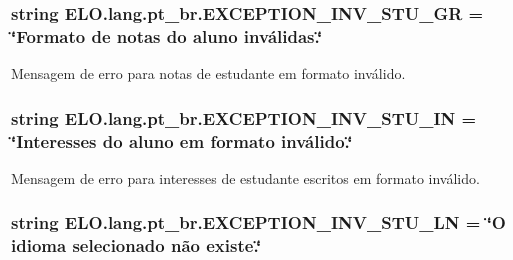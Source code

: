 \hypertarget{namespaceELO_1_1lang_1_1pt__br_a52e9b4ddabc505da1471bed2b82ec8bd}{
\subsubsection[{E\-X\-C\-E\-P\-T\-I\-O\-N\-\_\-\-I\-N\-V\-\_\-\-S\-T\-U\-\_\-\-G\-R}]{\setlength{\rightskip}{0pt plus 5cm}string E\-L\-O.\-lang.\-pt\-\_\-br.\-E\-X\-C\-E\-P\-T\-I\-O\-N\-\_\-\-I\-N\-V\-\_\-\-S\-T\-U\-\_\-\-G\-R = \char`\"{}Formato de notas do aluno inválidas.\char`\"{}}}\label{d5/d70/namespaceELO_1_1lang_1_1pt__br_a52e9b4ddabc505da1471bed2b82ec8bd}


Mensagem de erro para notas de estudante em formato inválido. 

\hypertarget{namespaceELO_1_1lang_1_1pt__br_a03f94f11d51e3124eea071051a30b0b5}{
\subsubsection[{E\-X\-C\-E\-P\-T\-I\-O\-N\-\_\-\-I\-N\-V\-\_\-\-S\-T\-U\-\_\-\-I\-N}]{\setlength{\rightskip}{0pt plus 5cm}string E\-L\-O.\-lang.\-pt\-\_\-br.\-E\-X\-C\-E\-P\-T\-I\-O\-N\-\_\-\-I\-N\-V\-\_\-\-S\-T\-U\-\_\-\-I\-N = \char`\"{}Interesses do aluno em formato inválido.\char`\"{}}}\label{d5/d70/namespaceELO_1_1lang_1_1pt__br_a03f94f11d51e3124eea071051a30b0b5}


Mensagem de erro para interesses de estudante escritos em formato inválido. 

\hypertarget{namespaceELO_1_1lang_1_1pt__br_a931b46af9287ef64fa4c73e99c914ebd}{
\subsubsection[{E\-X\-C\-E\-P\-T\-I\-O\-N\-\_\-\-I\-N\-V\-\_\-\-S\-T\-U\-\_\-\-L\-N}]{\setlength{\rightskip}{0pt plus 5cm}string E\-L\-O.\-lang.\-pt\-\_\-br.\-E\-X\-C\-E\-P\-T\-I\-O\-N\-\_\-\-I\-N\-V\-\_\-\-S\-T\-U\-\_\-\-L\-N = \char`\"{}O idioma selecionado não existe.\char`\"{}}}\label{d5/d70/namespaceELO_1_1lang_1_1pt__br_a931b46af9287ef64fa4c73e99c914ebd}


